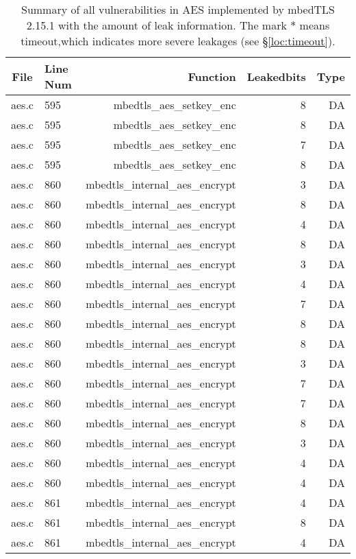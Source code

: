 \begin{table}%
\centering\tiny
\caption{Summary of all vulnerabilities in AES implemented by mbedTLS 2.15.1 with the amount of leak information. The mark $*$ means timeout,which indicates more severe leakages (see \S\ref{loc:timeout}).}\label{tab:AESmbedTLS}
\begin{tabular}{clrrr}
\hline
\textbf{File} & \textbf{Line Num} & \textbf{Function} & \textbf{Leakedbits} & \textbf{Type} \\\hline
aes.c& 595&mbedtls\_aes\_setkey\_enc&8 &DA\\
aes.c& 595&mbedtls\_aes\_setkey\_enc&8 &DA\\
aes.c& 595&mbedtls\_aes\_setkey\_enc&7 &DA\\
aes.c& 595&mbedtls\_aes\_setkey\_enc&8 &DA\\
aes.c& 860&mbedtls\_internal\_aes\_encrypt&3 &DA\\
aes.c& 860&mbedtls\_internal\_aes\_encrypt&8 &DA\\
aes.c& 860&mbedtls\_internal\_aes\_encrypt&4 &DA\\
aes.c& 860&mbedtls\_internal\_aes\_encrypt&8 &DA\\
aes.c& 860&mbedtls\_internal\_aes\_encrypt&3 &DA\\
aes.c& 860&mbedtls\_internal\_aes\_encrypt&4 &DA\\
aes.c& 860&mbedtls\_internal\_aes\_encrypt&7 &DA\\
aes.c& 860&mbedtls\_internal\_aes\_encrypt&8 &DA\\
aes.c& 860&mbedtls\_internal\_aes\_encrypt&8 &DA\\
aes.c& 860&mbedtls\_internal\_aes\_encrypt&3 &DA\\
aes.c& 860&mbedtls\_internal\_aes\_encrypt&7 &DA\\
aes.c& 860&mbedtls\_internal\_aes\_encrypt&7 &DA\\
aes.c& 860&mbedtls\_internal\_aes\_encrypt&8 &DA\\
aes.c& 860&mbedtls\_internal\_aes\_encrypt&3 &DA\\
aes.c& 860&mbedtls\_internal\_aes\_encrypt&4 &DA\\
aes.c& 860&mbedtls\_internal\_aes\_encrypt&4 &DA\\
aes.c& 861&mbedtls\_internal\_aes\_encrypt&4 &DA\\
aes.c& 861&mbedtls\_internal\_aes\_encrypt&8 &DA\\
aes.c& 861&mbedtls\_internal\_aes\_encrypt&4 &DA\\

\end{tabular}
\end{table}
